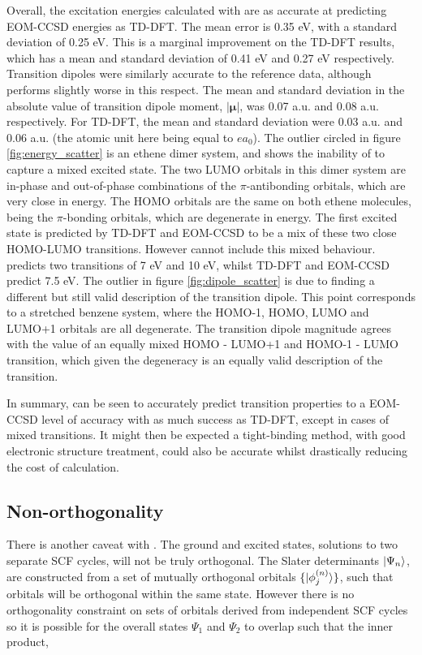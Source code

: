 Overall, the excitation energies calculated with \dscf are as accurate at predicting
EOM-CCSD energies as TD-DFT. The mean error is 0.35 eV, with a standard deviation
of 0.25 eV. This is a marginal improvement on the TD-DFT results, which has a mean
and standard deviation of 0.41 eV and 0.27 eV respectively. Transition dipoles 
were similarly accurate to the reference data, although \dscf performs slightly 
worse in this respect. The mean and standard deviation in the absolute value
of transition dipole moment, $|\mathbf{\mu}|$, was 0.07 a.u. and 0.08 a.u. respectively.
For TD-DFT, the mean and standard deviation were 0.03 a.u. and 0.06 a.u. (the atomic
unit here being equal to $ea_0$).
The outlier circled in figure \ref{fig:energy_scatter} is an ethene dimer system,
and shows the inability of \dscf to capture a mixed excited state. The two LUMO
orbitals in this dimer system are in-phase and out-of-phase combinations of the 
$\pi$-antibonding orbitals, which are very close in energy. The HOMO
orbitals are the same on both ethene molecules, being the $\pi$-bonding orbitals, 
which are degenerate in energy. The first excited state is predicted by TD-DFT and
EOM-CCSD to be a mix of these two close HOMO-LUMO transitions. However \dscf cannot
include this mixed behaviour. \dscf predicts two transitions of 7 eV and 10 eV,
whilst TD-DFT and EOM-CCSD predict 7.5 eV.
The outlier in figure \ref{fig:dipole_scatter} is due to \dscf finding a different
but still valid description of the transition dipole. This point corresponds to 
a stretched benzene system, where the HOMO-1, HOMO, LUMO and LUMO+1 orbitals are
all degenerate. The \dscf transition dipole magnitude agrees with the value of an
equally mixed HOMO - LUMO+1 and HOMO-1 - LUMO transition, which given the degeneracy
is an equally valid description of the transition.

In summary, \dscf can be seen to accurately predict transition properties
to a EOM-CCSD level of accuracy with as much success as TD-DFT, except in cases
of mixed transitions. It might then be expected a tight-binding method, with good electronic 
structure treatment, could also be accurate whilst drastically reducing
the cost of calculation. 

\subsection{Non-orthogonality}
\label{subsec:dscf_nonorth}
There is another caveat with \dscf. The ground and excited states, solutions
to two separate SCF cycles, will not be truly orthogonal. The
Slater determinants $\ket{\Psi_n}$, are constructed from a set of mutually orthogonal
orbitals $\{ \ket{\phi_j^{\left(n\right)}} \}$, such that orbitals will be orthogonal 
within the same state. However there is no orthogonality constraint on sets of orbitals
derived from independent SCF cycles so it is possible for the overall states 
$\Psi_1$ and $\Psi_2$ to overlap such that the inner product,

